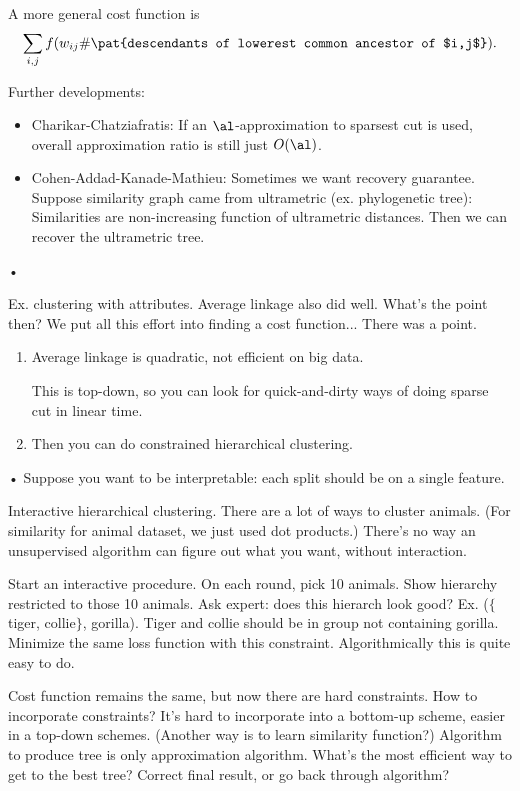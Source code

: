 A more general cost function is 
$$
\sum_{i,j} f(w_{ij} \#\pat{descendants of lowerest common ancestor of $i,j$}).
$$

Further developments:
\begin{itemize}
\item

Charikar-Chatziafratis: If an $\al$-approximation to sparsest cut is used, overall approximation ratio is still just $O(\al)$.
\item
Cohen-Addad-Kanade-Mathieu: 
Sometimes we want recovery guarantee. Suppose similarity graph came from ultrametric (ex. phylogenetic tree): 
Similarities are non-increasing function of ultrametric distances. Then we can recover the ultrametric tree.
\end{itemize}•

Ex. clustering with attributes. Average linkage also did well. What's the point then? We put all this effort into finding a cost function... There was a point.

\begin{enumerate}
\item
Average linkage is quadratic, not efficient on big data.

This is top-down, so you can look for quick-and-dirty ways of doing sparse cut in linear time. 
\item
Then you can do constrained hierarchical clustering.
\end{enumerate}•
Suppose you want to be interpretable: each split should be on a single feature.

Interactive hierarchical clustering. There are a lot of ways to cluster animals. (For similarity for animal dataset, we just used dot products.) There's no way an unsupervised algorithm can figure out what you want, without interaction.

Start an interactive procedure. On each round, pick 10 animals. Show hierarchy restricted to those 10 animals. Ask expert: does this hierarch look good? Ex. ($\{$tiger, collie$\}$, gorilla). Tiger and collie should be in group not containing gorilla. Minimize the same loss function with this constraint. Algorithmically this is quite easy to do.

Cost function remains the same, but now there are hard constraints. 
How to incorporate constraints? It's hard to incorporate into a bottom-up scheme, easier in a top-down schemes. %
(Another way is to learn similarity function?) %
Algorithm to produce tree is only approximation algorithm. What's the most efficient way to get to the best tree? Correct final result, or go back through algorithm?

